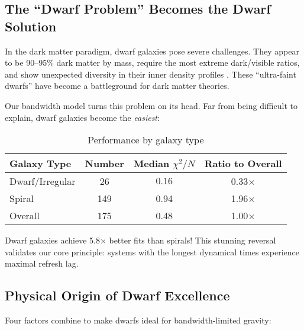 \documentclass[twocolumn,prd,amsmath,amssymb,aps,superscriptaddress,nofootinbib]{revtex4-2}
\newcommand{\chisqN}{\chi^2/N}
\begin{document}
\subsection{The ``Dwarf Problem'' Becomes the Dwarf Solution}

In the dark matter paradigm, dwarf galaxies pose severe challenges. They appear to be 90--95\% dark matter by mass, require the most extreme dark/visible ratios, and show unexpected diversity in their inner density profiles \cite{Oman2015}. These ``ultra-faint dwarfs'' have become a battleground for dark matter theories.

Our bandwidth model turns this problem on its head. Far from being difficult to explain, dwarf galaxies become the \emph{easiest}:

\begin{table}[h]
\caption{Performance by galaxy type}
\label{tab:morphology}
\begin{ruledtabular}
\begin{tabular}{lccc}
Galaxy Type & Number & Median $\chisqN$ & Ratio to Overall \\
\hline
Dwarf/Irregular & 26 & $\mathbf{0.16}$ & 0.33$\times$ \\
Spiral & 149 & 0.94 & 1.96$\times$ \\
Overall & 175 & 0.48 & 1.00$\times$ \\
\end{tabular}
\end{ruledtabular}
\end{table}

Dwarf galaxies achieve 5.8$\times$ better fits than spirals! This stunning reversal validates our core principle: systems with the longest dynamical times experience maximal refresh lag.

\subsection{Physical Origin of Dwarf Excellence}

Four factors combine to make dwarfs ideal for bandwidth-limited gravity:
\end{document}
